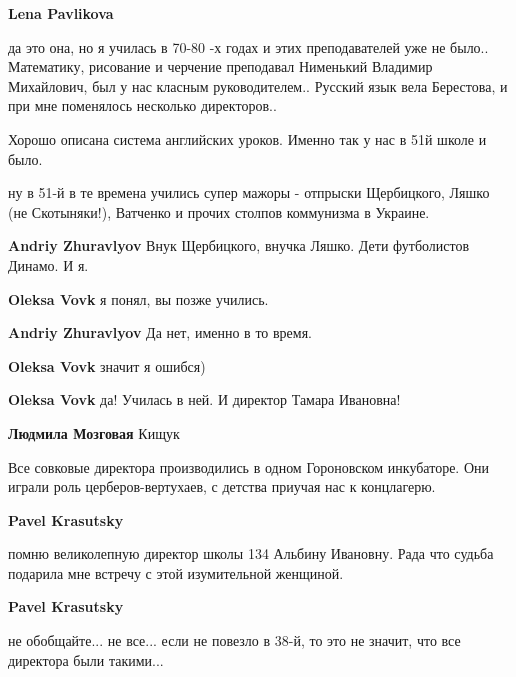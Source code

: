 \begin{itemize}
\begin{itemize}
\textbf{Lena Pavlikova} 

да это она, но я училась в 70-80 -х годах и этих преподавателей уже не
было.. Математику, рисование и черчение преподавал Нименький Владимир
Михайлович, был у нас класным руководителем.. Русский язык вела Берестова, и при
мне поменялось несколько директоров..

\end{itemize} %


Хорошо описана система английских уроков. Именно так у нас в 51й школе и было.

\begin{itemize} %

ну в 51-й в те времена учились супер мажоры - отпрыски Щербицкого, Ляшко (не
Скотыняки!), Ватченко и прочих столпов коммунизма в Украине.

\begin{itemize} %
\textbf{Andriy Zhuravlyov} Внук Щербицкого, внучка Ляшко. Дети футболистов Динамо. И я.

\textbf{Oleksa Vovk} я понял, вы позже учились.

\textbf{Andriy Zhuravlyov} Да нет, именно в то время.

\textbf{Oleksa Vovk} значит я ошибся)
\end{itemize} %

\textbf{Oleksa Vovk} да! Училась в ней. И директор Тамара Ивановна!

\textbf{Людмила Мозговая} Кищук

\end{itemize} %


Все совковые директора производились в одном Гороновском инкубаторе. Они играли
роль церберов-вертухаев, с детства приучая нас к концлагерю.

\begin{itemize} %
\textbf{Pavel Krasutsky} 

помню великолепную директор школы 134 Альбину Ивановну. Рада что судьба
подарила мне встречу с этой изумительной женщиной.

\textbf{Pavel Krasutsky} 

не обобщайте... не все... если не повезло в 38-й, то это не значит, что все
директора были такими...


\end{itemize}
\end{itemize}
